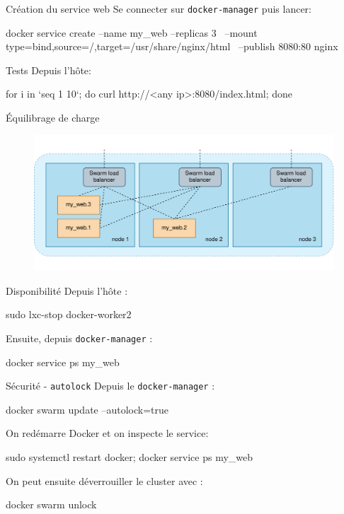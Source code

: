 \documentclass{cubeamer}
\begin{document}
\begin{frame}[fragile]{Création du service web}
Se connecter sur \verb:docker-manager: puis lancer:
\begin{bash}
docker service create --name my_web --replicas 3 \
    --mount type=bind,source=/,target=/usr/share/nginx/html \
    --publish 8080:80 nginx
\end{bash}
\end{frame}

\begin{frame}[fragile]{Tests}
Depuis l'hôte:
\begin{bash}
for i in `seq 1 10`; do curl http://<any ip>:8080/index.html; done
\end{bash}
\end{frame}

\begin{frame}{Équilibrage de charge}
    \begin{figure}
        \centering
        \includegraphics[width=\textwidth]{img/routing-mesh}
    \end{figure}
\end{frame}

\begin{frame}[fragile]{Disponibilité}
Depuis l'hôte :
\begin{bash}
sudo lxc-stop docker-worker2
\end{bash}

Ensuite, depuis \verb:docker-manager: :
\begin{bash}
docker service ps my_web
\end{bash}
\end{frame}

\begin{frame}[fragile]{Sécurité - \texttt{autolock}}
Depuis le \verb:docker-manager: :
\begin{bash}
docker swarm update --autolock=true
\end{bash}

On redémarre Docker et on inspecte le service:
\begin{bash}
sudo systemctl restart docker; docker service ps my_web
\end{bash}

On peut ensuite déverrouiller le cluster avec :
\begin{bash}
docker swarm unlock
\end{bash}
\end{frame}
\end{document}
